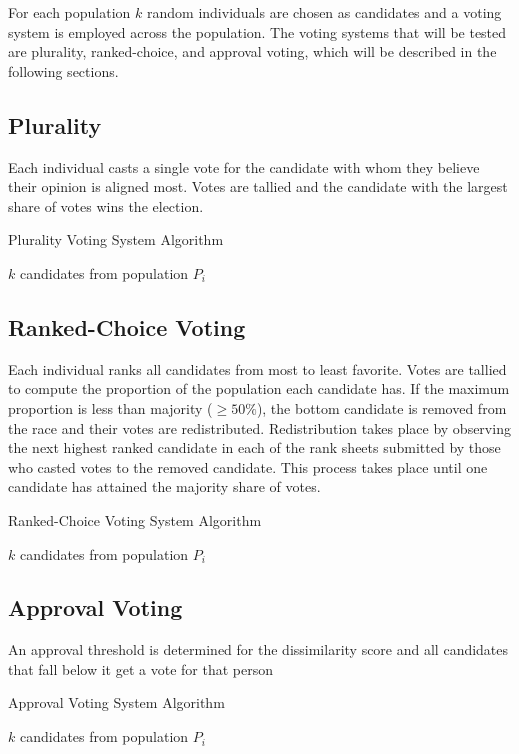 
For each population $k$ random individuals are chosen as candidates and a voting system is employed across the population.
The voting systems that will be tested are plurality, ranked-choice, and approval voting, which will be described in the following sections.
\subsection{Plurality}
Each individual casts a single vote for the candidate with whom they believe their opinion is aligned most.
Votes are tallied and the candidate with the largest share of votes wins the election.
\begin{algorithm}[H]
\caption{Plurality Voting System Algorithm}\label{alg:plurality}
\begin{algorithmic}
\State \Choose $k$ candidates from population $P_i$
\end{algorithmic}
\end{algorithm}

\subsection{Ranked-Choice Voting}
Each individual ranks all candidates from most to least favorite.
Votes are tallied to compute the proportion of the population each candidate has.
If the maximum proportion is less than majority ($\geq 50\%$), the bottom candidate is removed from the race and their votes are redistributed.
Redistribution takes place by observing the next highest ranked candidate in each of the rank sheets submitted by those who casted votes
to the removed candidate. This process takes place until one candidate has attained the majority share of votes.
\begin{algorithm}[H]
\caption{Ranked-Choice Voting System Algorithm}\label{alg:ranked}
\begin{algorithmic}
\State \Choose $k$ candidates from population $P_i$
\end{algorithmic}
\end{algorithm}

\subsection{Approval Voting}
An approval threshold is determined for the dissimilarity score and all candidates that fall below it get a vote for that person
\begin{algorithm}[H]
\caption{Approval Voting System Algorithm}\label{alg:approval}
\begin{algorithmic}
\State \Choose $k$ candidates from population $P_i$
\end{algorithmic}
\end{algorithm}


